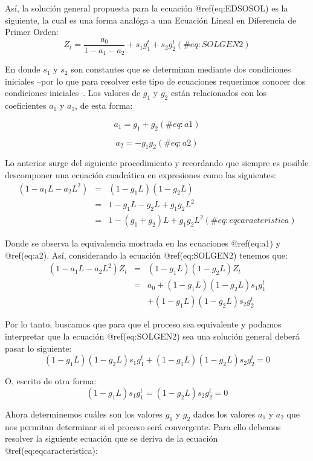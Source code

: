 \documentclass[
  a4paper,
]{article}
\begin{document}
Así, la solución general propuesta para la ecuación @ref(eq:EDSOSOL) es
la siguiente, la cual es una forma analóga a una Ecuación Lineal en
Diferencia de Primer Orden: \[
    Z_t = \frac{a_0}{1 - a_1 - a_2} + s_1 g^t_1 + s_2 g^t_2
    (\#eq:SOLGEN2)
\]

En donde \(s_1\) y \(s_2\) son constantes que se determinan mediante dos
condiciones iniciales --por lo que para resolver este tipo de ecuaciones
requerimos conocer dos condiciones iniciales--. Los valores de \(g_1\) y
\(g_2\) están relacionados con los coeficientes \(a_1\) y \(a_2\), de
esta forma:

\[
  a_1  =  g_1 + g_2
  (\#eq:a1)
\]

\[
    a_2  =  - g_1 g_2
    (\#eq:a2)
\]

Lo anterior surge del siguiente procedimiento y recordando que siempre
es posible descomponer una ecuación cuadrática en expresiones como las
siguientes: \begin{eqnarray}
    (1 - a_1 L - a_2 L^2) & = & (1 - g_1 L)(1 - g_2 L) \nonumber \\
    & = & 1 - g_1 L - g_2 L + g_1 g_2 L^2 \nonumber \\
    & = & 1 - (g_1 + g_2) L + g_1 g_2 L^2
    (\#eq:eqcaracteristica)
\end{eqnarray}

Donde se observa la equivalencia mostrada en las ecuaciones @ref(eq:a1)
y @ref(eq:a2). Así, considerando la ecuación @ref(eq:SOLGEN2) tenemos
que: \begin{eqnarray}
    (1 - a_1 L - a_2 L^2) Z_t & = & (1 - g_1 L)(1 - g_2 L) Z_t \nonumber \\
    & = & a_0 + (1 - g_1 L)(1 - g_2 L) s_1 g^t_1 \nonumber \\
    &  & + (1 - g_1 L)(1 - g_2 L) s_2 g^t_2
\end{eqnarray}

Por lo tanto, buscamos que para que el proceso sea equivalente y podamos
interpretar que la ecuación @ref(eq:SOLGEN2) sea una solución general
deberá pasar lo siguiente: \[
    (1 - g_1 L) (1 - g_2 L) s_1 g^t_1 + (1 - g_1 L) (1 - g_2 L) s_2 g^t_2 = 0
\]

O, escrito de otra forma: \[
    (1 - g_1 L) s_1 g^t_1 = (1 - g_2 L) s_2 g^t_2 = 0
\]

Ahora determinemos cuáles son los valores \(g_1\) y \(g_2\) dados los
valores \(a_1\) y \(a_2\) que nos permitan determinar si el proceso será
convergente. Para ello debemos resolver la siguiente ecuación que se
deriva de la ecuación @ref(eq:eqcaracteristica):
\end{document}
